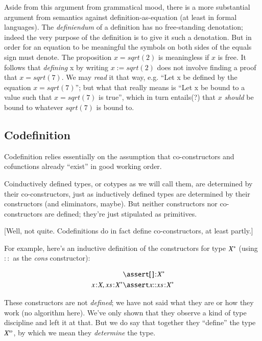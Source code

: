 \documentclass{article}
\begin{document}
Aside from this argument from grammatical mood, there is a more
substantial argument from semantics against definition-as-equation (at
least in formal languages). The \textit{definiendum} of a definition
has no free-standing denotation; indeed the very purpose of the
definition is to give it such a denotation. But in order for an
equation to be meaningful the symbols on both sides of the equals sign
must denote. The proposition \(x = sqrt(2)\) is meaningless if \(x\)
is free. It follows that \textit{defining} x by writing \(x :=
sqrt(2)\) does not involve finding a proof that \(x = sqrt(7)\). We
may \textit{read} it that way, e.g. ``Let x be defined by the equation
\(x = sqrt(7)\)''; but what that really means is ``Let x be bound to a
value such that \(x = sqrt(7)\) is true'', which in turn entails(?)
that \(x\) \textit{should} be bound to whatever \(sqrt(7)\) is bound
to.

\subsection{Codefinition}

Codefinition relies essentially on the assumption that co-constructors
and cofunctions already ``exist'' in good working order.

Coinductively defined types, or cotypes as we will call them, are
determined by their co-constructors, just as inductively defined types
are determined by their constructors (and eliminators, maybe). But
neither constructors nor co-constructors are defined; they're just
stipulated as primitives.

[Well, not quite. Codefinitions do in fact define co-constructors, at
  least partly.]

For example, here's an inductive definition of the constructors for
type \({X^{*}}\) (using \(\mathpunct{::}\) as the \textit{cons}
constructor):

\begin{align}
  & \linfer \tj{\listld\,\listrd}{\List{X}} \\
  \tj{x}{X}, \tj{\seq{x}}{\List{X}} &\linfer \tj{x\cons{}\seq{x}}{\List{X}} \\
\end{align}

These constructors are not \textit{defined}; we have not said what
they are or how they work (no algorithm here). We've only shown that
they observe a kind of type discipline and left it at that. But we do
say that together they ``define'' the type \(\colist{X}\), by which
we mean they \textit{determine} the type.
\end{document}
